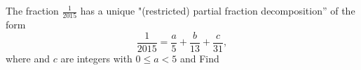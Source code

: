 The fraction $\tfrac1{2015}$ has a unique "(restricted) partial fraction decomposition'' of the form \[\dfrac1{2015}=\dfrac a5+\dfrac b{13}+\dfrac c{31},\] where   and $c$ are integers with $0\leq a<5$ and   Find 